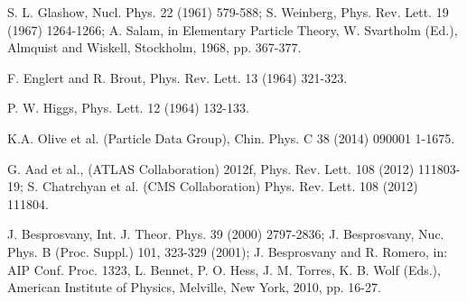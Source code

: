 \documentclass[12pt]{article}
\renewcommand\[{\begin{dmath}}
\renewcommand\]{\end{dmath}}
\begin{document}
\begin{thebibliography}{99}




 S. L. Glashow,
 Nucl. Phys.   22   (1961)   579-588;
 S. Weinberg,
 Phys. Rev. Lett.     19   (1967) 1264-1266;
  A.  Salam,  in   Elementary Particle
Theory, W. Svartholm (Ed.),  Almquist and Wiskell, Stockholm, 1968, pp. 367-377.








  F. Englert and R. Brout,
 Phys. Rev. Lett.   13  (1964) 321-323.

    P. W. Higgs,
Phys.  Lett.   12  (1964) 132-133.



K.A. Olive et al. (Particle Data Group), Chin. Phys. C    38  (2014)  090001 1-1675.

  G. Aad et al., (ATLAS Collaboration) 2012f,
Phys. Rev. Lett.    108  (2012) 111803-19;
S. Chatrchyan et al. (CMS Collaboration) Phys. Rev. Lett. 108 (2012) 111804.


  J.  Besprosvany,
Int. J. Theor. Phys.   39  (2000)  2797-2836; J.
Besprosvany, Nuc. Phys. B (Proc. Suppl.)   101,  323-329 (2001);   J. Besprosvany and R. Romero, in: AIP  Conf. Proc. 1323, L. Bennet, P. O. Hess, J. M. Torres, K. B. Wolf (Eds.),   American Institute of Physics, Melville, New York, 2010, pp. 16-27.


\end{thebibliography}
\end{document}
